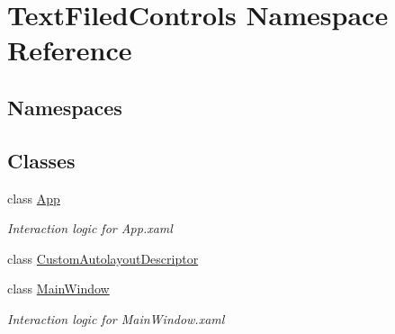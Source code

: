 \hypertarget{namespace_text_filed_controls}{}\section{Text\+Filed\+Controls Namespace Reference}
\label{namespace_text_filed_controls}
\subsection*{Namespaces}
\begin{DoxyCompactItemize}
\end{DoxyCompactItemize}
\subsection*{Classes}
\begin{DoxyCompactItemize}
\item 
class \mbox{\hyperlink{class_text_filed_controls_1_1_app}{App}}
\begin{DoxyCompactList}\small\item\em Interaction logic for App.\+xaml \end{DoxyCompactList}\item 
class \mbox{\hyperlink{class_text_filed_controls_1_1_custom_autolayout_descriptor}{Custom\+Autolayout\+Descriptor}}
\item 
class \mbox{\hyperlink{class_text_filed_controls_1_1_main_window}{Main\+Window}}
\begin{DoxyCompactList}\small\item\em Interaction logic for Main\+Window.\+xaml \end{DoxyCompactList}\end{DoxyCompactItemize}
